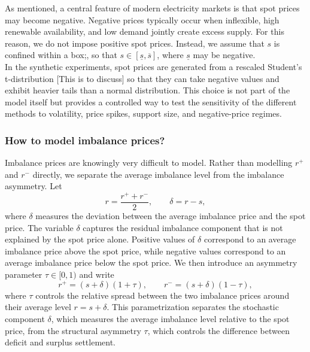 \documentclass[11pt]{article}
\theoremstyle{plain}
\theoremstyle{definition}
\begin{document}
\noindent As mentioned, a central feature of modern electricity markets is that spot prices may become negative. 
Negative prices typically occur when inflexible, high renewable availability, and low demand jointly create excess supply.
For this reason, we do not impose positive spot prices. 
Instead, we assume that $s$ is confined within a box;, so that $s\in[\underline s,\overline s]$, where $\underline s$ may be negative.
\\

\noindent In the synthetic experiments, spot prices are generated from a rescaled Student's t-distribution \color{red}[This is to discuss] \color{black}so that they can take negative values and exhibit heavier tails than a normal distribution.
This choice is not part of the model itself but provides a controlled way to test the sensitivity of the different methods to volatility, price spikes, support size, and negative-price regimes.

\subsubsection{How to model imbalance prices?}
\label{subsubsec:model-imbalance-price}

Imbalance prices are knowingly very difficult to model.
Rather than modelling $r^+$ and $r^-$ directly, we separate the average imbalance level from the imbalance asymmetry. 
Let \[ r=\frac{r^++r^-}{2}, \qquad \delta=r-s, \] where $\delta$ measures the deviation between the average imbalance price and the spot price. 
The variable $\delta$ captures the residual imbalance component that is not explained by the spot price alone. 
Positive values of $\delta$ correspond to an average imbalance price above the spot price, while negative values correspond to an average imbalance price below the spot price.
We then introduce an asymmetry parameter $\tau\in[0,1)$ and write
\begin{equation}
    \label{eq:imbalance-reparam}
    r^+=(s+\delta)(1+\tau),
    \qquad
    r^-=(s+\delta)(1-\tau),
\end{equation}
where $\tau$ controls the relative spread between the two imbalance prices around their average level $r=s+\delta$. 
This parametrization separates the stochastic component $\delta$, which measures the average imbalance level relative to the spot price, from the structural asymmetry $\tau$, which controls the difference between deficit and surplus settlement.
\\
\end{document}
